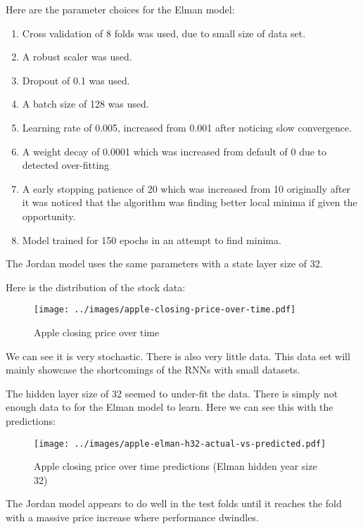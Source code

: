 \documentclass[conference]{IEEEtran}
\begin{document}
Here are the parameter choices for the Elman model:

\begin{enumerate}[]
	\item Cross validation of 8 folds was used, due to small size of data set.
	\item A robust scaler was used.
	\item Dropout of 0.1 was used.
	\item A batch size of 128 was used.
	\item Learning rate of 0.005, increased from 0.001 after noticing slow convergence.
	\item A weight decay of 0.0001 which was increased from default of 0 due to detected over-fitting
	\item A early stopping patience of 20 which was increased from 10 originally after it was noticed that the algorithm was finding better local minima if given the opportunity.
	\item Model trained for 150 epochs in an attempt to find minima.
\end{enumerate}

The Jordan model uses the same parameters with a state layer size of 32.

Here is the distribution of the stock data:

\begin{figure}[H] 
	\centering
	\texttt{[image: ../images/apple-closing-price-over-time.pdf]}
	\caption{Apple closing price over time}
	\label{fig:apple-closing}
\end{figure}

We can see it is very stochastic. There is also very little data. This data set will mainly showcase the shortcomings of the RNNs with small datasets. 

The hidden layer size of 32 seemed to under-fit the data. There is simply not enough data to for the Elman model to learn. Here we can see this with the predictions:

\begin{figure}[H] 
	\centering
	\texttt{[image: ../images/apple-elman-h32-actual-vs-predicted.pdf]}
	\caption{Apple closing price over time predictions (Elman hidden year size 32)}
	\label{fig:apple-closing-predictions}
\end{figure}

The Jordan model appears to do well in the test folds until it reaches the fold with a massive price increase where performance dwindles.
\end{document}
